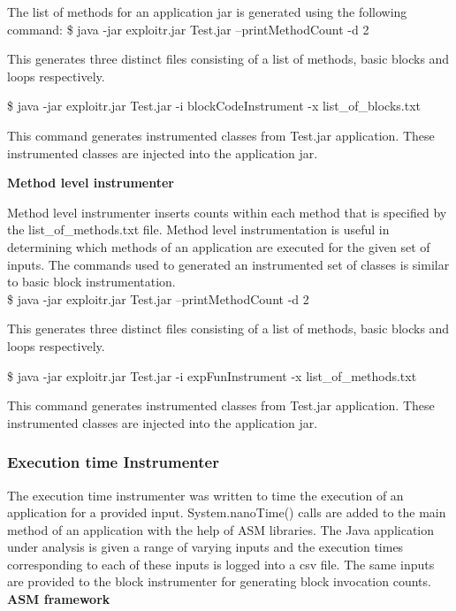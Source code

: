 \documentclass[11pt]{article}
\begin{document}
The list of methods for an application jar is generated using the following command:\newline
\$ java -jar exploitr.jar Test.jar --printMethodCount -d 2

This generates three distinct files consisting of a list of methods, basic blocks and loops respectively. 

\$ java -jar exploitr.jar Test.jar -i blockCodeInstrument -x list\_of\_blocks.txt

This command generates instrumented classes from Test.jar application. These instrumented classes are injected into the application jar.

\textbf{Method level instrumenter}\newline

Method level instrumenter inserts counts within each method that is specified by the list\_of\_methods.txt file. Method level instrumentation is useful in determining which methods of an application are executed for the given set of inputs. The commands used to generated an instrumented set of classes is similar to basic block instrumentation.\\

\$ java -jar exploitr.jar Test.jar --printMethodCount -d 2

This generates three distinct files consisting of a list of methods, basic blocks and loops respectively. 

\$ java -jar exploitr.jar Test.jar -i expFunInstrument -x list\_of\_methods.txt

This command generates instrumented classes from Test.jar application. These instrumented classes are injected into the application jar.

\subsubsection{Execution time Instrumenter}
The execution time instrumenter was written to time the execution of an application for a provided input. System.nanoTime() calls are added to the main method of an application with the help of ASM libraries. The Java application under analysis is given a range of varying inputs and the execution times corresponding to each of these inputs is logged into a csv file. The same inputs are provided to the block instrumenter for generating block invocation counts. \\

\textbf{ASM framework}\newline
\end{document}
